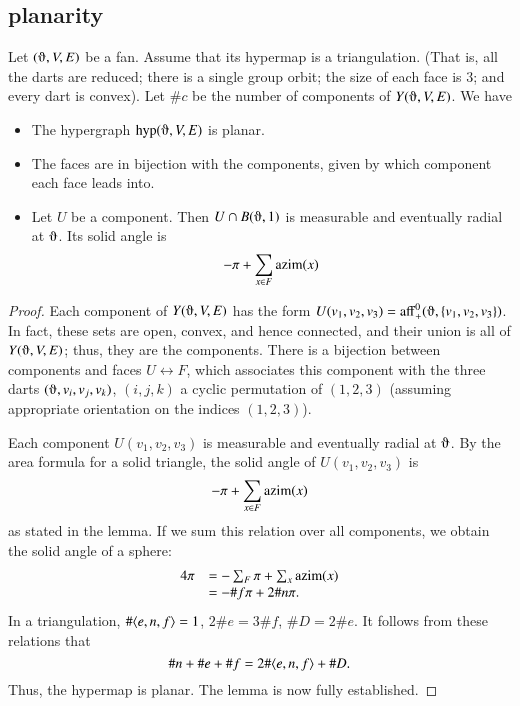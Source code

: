 \subsection{planarity}

\begin{lemma}
Let $(\orgn,V,E)$ be a fan.  Assume
that its hypermap is a triangulation. (That is, all the darts are reduced; there is a single group orbit; the size of each face is $3$; and every dart is
convex).   
Let $\#c$ be the number
of components of $Y(\orgn,V,E)$.  We have
    \begin{itemize}
    \item The hypergraph $\op{hyp}(\orgn,V,E)$ is planar.
    \item The faces are in bijection with the components, given by which
    component each face leads into.
        \item Let $U$ be a component. Then $U \cap B(\orgn,1)$ 
       is measurable and eventually radial at $\orgn$.  Its solid angle is
        $$-\pi + \sum_{x\in F} {\operatorname{azim}}(x)$$
    \end{itemize}
\end{lemma}

\begin{proof}
Each component 
of $Y(\orgn,V,E)$ has
the form $U(v_1,v_2,v_3)=\op{aff}_+^0(\orgn,\{v_1,v_2,v_3\})$.  In fact,
these sets are open, convex, and hence connected, 
and their union is all of $Y(\orgn,V,E)$; thus,
they are the components.   There is a bijection
between components and faces $U \leftrightarrow F$, which associates this component
with the three darts $(\orgn,v_i,v_j,v_k)$, $(i,j,k)$ a cyclic permutation
of $(1,2,3)$  (assuming appropriate orientation on the indices $(1,2,3)$).

Each component $U(v_1,v_2,v_3)$ is measurable and eventually radial
at $\orgn$.  By the area formula for a solid triangle, the solid angle of $U(v_1,v_2,v_3)$
is 
   $$-\pi + \sum_{x\in F} {\operatorname{azim}}(x)$$
as stated in the lemma.  If we sum this relation over all components, we obtain
the solid angle of a sphere:
   \begin{equation}\tlabel{eqn:euler}
   \begin{array}{lll}
   4\pi &= -\sum_{F} \pi + \sum_{x} \op{azim}(x)\\
        &= -\#f \pi + 2 \# n \pi.
   \end{array}
   \end{equation}
In a triangulation, $\#\langle e,n,f\rangle=1$, $2 \# e  = 3\#f$, $\# D = 2 \#e$.
It follows from these relations that
   $$
   \#n + \# e + \# f = 2\#\langle e,n,f\rangle+\# D.
   $$
Thus, the hypermap is planar.  The lemma is now fully established.
\end{proof}


